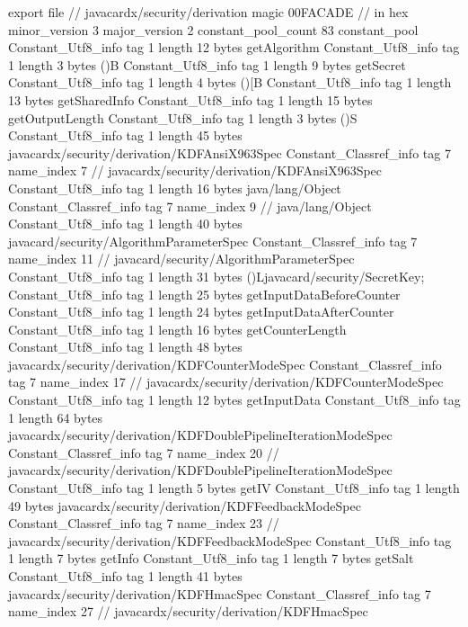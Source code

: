 export file {		// javacardx/security/derivation
	magic	00FACADE		 // in hex
	minor_version	3
	major_version	2
	constant_pool_count	83
	constant_pool {
		Constant_Utf8_info {
			tag	1
			length	12
			bytes	getAlgorithm
		}
		Constant_Utf8_info {
			tag	1
			length	3
			bytes	()B
		}
		Constant_Utf8_info {
			tag	1
			length	9
			bytes	getSecret
		}
		Constant_Utf8_info {
			tag	1
			length	4
			bytes	()[B
		}
		Constant_Utf8_info {
			tag	1
			length	13
			bytes	getSharedInfo
		}
		Constant_Utf8_info {
			tag	1
			length	15
			bytes	getOutputLength
		}
		Constant_Utf8_info {
			tag	1
			length	3
			bytes	()S
		}
		Constant_Utf8_info {
			tag	1
			length	45
			bytes	javacardx/security/derivation/KDFAnsiX963Spec
		}
		Constant_Classref_info {
			tag	7
			name_index	7		// javacardx/security/derivation/KDFAnsiX963Spec
		}
		Constant_Utf8_info {
			tag	1
			length	16
			bytes	java/lang/Object
		}
		Constant_Classref_info {
			tag	7
			name_index	9		// java/lang/Object
		}
		Constant_Utf8_info {
			tag	1
			length	40
			bytes	javacard/security/AlgorithmParameterSpec
		}
		Constant_Classref_info {
			tag	7
			name_index	11		// javacard/security/AlgorithmParameterSpec
		}
		Constant_Utf8_info {
			tag	1
			length	31
			bytes	()Ljavacard/security/SecretKey;
		}
		Constant_Utf8_info {
			tag	1
			length	25
			bytes	getInputDataBeforeCounter
		}
		Constant_Utf8_info {
			tag	1
			length	24
			bytes	getInputDataAfterCounter
		}
		Constant_Utf8_info {
			tag	1
			length	16
			bytes	getCounterLength
		}
		Constant_Utf8_info {
			tag	1
			length	48
			bytes	javacardx/security/derivation/KDFCounterModeSpec
		}
		Constant_Classref_info {
			tag	7
			name_index	17		// javacardx/security/derivation/KDFCounterModeSpec
		}
		Constant_Utf8_info {
			tag	1
			length	12
			bytes	getInputData
		}
		Constant_Utf8_info {
			tag	1
			length	64
			bytes	javacardx/security/derivation/KDFDoublePipelineIterationModeSpec
		}
		Constant_Classref_info {
			tag	7
			name_index	20		// javacardx/security/derivation/KDFDoublePipelineIterationModeSpec
		}
		Constant_Utf8_info {
			tag	1
			length	5
			bytes	getIV
		}
		Constant_Utf8_info {
			tag	1
			length	49
			bytes	javacardx/security/derivation/KDFFeedbackModeSpec
		}
		Constant_Classref_info {
			tag	7
			name_index	23		// javacardx/security/derivation/KDFFeedbackModeSpec
		}
		Constant_Utf8_info {
			tag	1
			length	7
			bytes	getInfo
		}
		Constant_Utf8_info {
			tag	1
			length	7
			bytes	getSalt
		}
		Constant_Utf8_info {
			tag	1
			length	41
			bytes	javacardx/security/derivation/KDFHmacSpec
		}
		Constant_Classref_info {
			tag	7
			name_index	27		// javacardx/security/derivation/KDFHmacSpec
}}}
